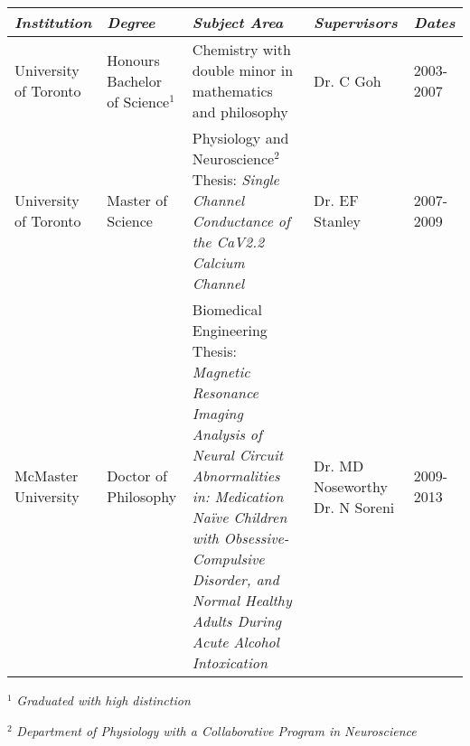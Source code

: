 \documentclass[11pt,notitlepage,english]{report}
\begin{document}

\begin{table}[h]
  \label{5. Post Sec Education}
  \begin{tabularx}{1\textwidth}{|p{2cm}|p{2cm}|p{8cm}|p{2.3cm}|X|}
    \hline
    \textit{Institution}  & \textit{Degree}                   & \textit{Subject Area}                                                                                                                                                                                                                                           & \textit{Supervisors}                        & \textit{Dates} \\
    \hline
    University of Toronto & Honours Bachelor of Science$^{1}$ & \raggedright Chemistry with double minor in mathematics and philosophy                                                                                                                                                                                          & Dr. C Goh                                   & 2003-2007      \\
    \hline
    University of Toronto & \raggedright Master of Science    & \raggedright Physiology and Neuroscience$^{2}$ \newline Thesis: \textit{Single Channel Conductance of the CaV2.2 Calcium Channel}                                                                                                                               & \raggedright Dr. EF Stanley                 & 2007-2009      \\
    \hline
    McMaster University   & \raggedright Doctor of Philosophy & \raggedright Biomedical Engineering \newline Thesis: \textit{Magnetic Resonance Imaging Analysis of Neural Circuit Abnormalities in: Medication Naïve Children with Obsessive-Compulsive Disorder, and Normal Healthy Adults During Acute Alcohol Intoxication} & \raggedright Dr. MD Noseworthy Dr. N Soreni & 2009-2013 \\
    \hline
  \end{tabularx}
\end{table}
\vspace{-8pt}

$^{1}$ \textit{Graduated with high distinction}

$^{2}$ \textit{Department of Physiology with a Collaborative Program in Neuroscience}

\vspace{5pt}
\end{document}
